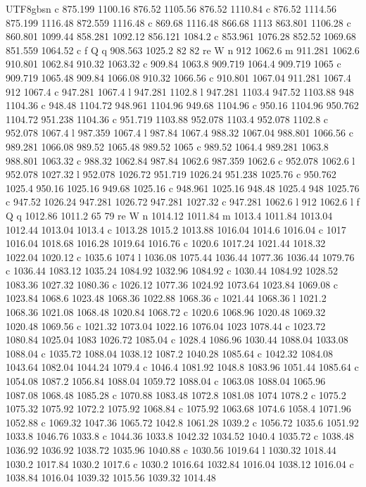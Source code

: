 \documentclass[11pt,a4paper,oneside]{report}
\begin{document}
\begin{CJK*}{UTF8}{gbsn}
{c 875.199 1100.16 876.52 1105.56 876.52 1110.84 c 876.52 1114.56 875.199 1116.48 872.559 1116.48 c 869.68
1116.48 866.68 1113 863.801 1106.28 c 860.801 1099.44 858.281 1092.12 856.121 1084.2 c 853.961 1076.28
852.52 1069.68 851.559 1064.52 c f Q q 908.563 1025.2 82 82 re W n 912 1062.6 m 911.281 1062.6 910.801
1062.84 910.32 1063.32 c 909.84 1063.8 909.719 1064.4 909.719 1065 c 909.719 1065.48 909.84 1066.08
910.32 1066.56 c 910.801 1067.04 911.281 1067.4 912 1067.4 c 947.281 1067.4 l 947.281 1102.8 l 947.281
1103.4 947.52 1103.88 948 1104.36 c 948.48 1104.72 948.961 1104.96 949.68 1104.96 c 950.16 1104.96
950.762 1104.72 951.238 1104.36 c 951.719 1103.88 952.078 1103.4 952.078 1102.8 c 952.078 1067.4 l
987.359 1067.4 l 987.84 1067.4 988.32 1067.04 988.801 1066.56 c 989.281 1066.08 989.52 1065.48 989.52
1065 c 989.52 1064.4 989.281 1063.8 988.801 1063.32 c 988.32 1062.84 987.84 1062.6 987.359 1062.6 c
952.078 1062.6 l 952.078 1027.32 l 952.078 1026.72 951.719 1026.24 951.238 1025.76 c 950.762 1025.4
950.16 1025.16 949.68 1025.16 c 948.961 1025.16 948.48 1025.4 948 1025.76 c 947.52 1026.24 947.281
1026.72 947.281 1027.32 c 947.281 1062.6 l 912 1062.6 l f Q q 1012.86 1011.2 65 79 re W n 1014.12 1011.84
m 1013.4 1011.84 1013.04 1012.44 1013.04 1013.4 c 1013.28 1015.2 1013.88 1016.04 1014.6 1016.04 c 1017
1016.04 1018.68 1016.28 1019.64 1016.76 c 1020.6 1017.24 1021.44 1018.32 1022.04 1020.12 c 1035.6 1074 l
1036.08 1075.44 1036.44 1077.36 1036.44 1079.76 c 1036.44 1083.12 1035.24 1084.92 1032.96 1084.92 c
1030.44 1084.92 1028.52 1083.36 1027.32 1080.36 c 1026.12 1077.36 1024.92 1073.64 1023.84 1069.08 c
1023.84 1068.6 1023.48 1068.36 1022.88 1068.36 c 1021.44 1068.36 l 1021.2 1068.36 1021.08 1068.48 1020.84
1068.72 c 1020.6 1068.96 1020.48 1069.32 1020.48 1069.56 c 1021.32 1073.04 1022.16 1076.04 1023 1078.44 c
1023.72 1080.84 1025.04 1083 1026.72 1085.04 c 1028.4 1086.96 1030.44 1088.04 1033.08 1088.04 c 1035.72
1088.04 1038.12 1087.2 1040.28 1085.64 c 1042.32 1084.08 1043.64 1082.04 1044.24 1079.4 c 1046.4 1081.92
1048.8 1083.96 1051.44 1085.64 c 1054.08 1087.2 1056.84 1088.04 1059.72 1088.04 c 1063.08 1088.04 1065.96
1087.08 1068.48 1085.28 c 1070.88 1083.48 1072.8 1081.08 1074 1078.2 c 1075.2 1075.32 1075.92 1072.2
1075.92 1068.84 c 1075.92 1063.68 1074.6 1058.4 1071.96 1052.88 c 1069.32 1047.36 1065.72 1042.8 1061.28
1039.2 c 1056.72 1035.6 1051.92 1033.8 1046.76 1033.8 c 1044.36 1033.8 1042.32 1034.52 1040.4 1035.72 c
1038.48 1036.92 1036.92 1038.72 1035.96 1040.88 c 1030.56 1019.64 l 1030.32 1018.44 1030.2 1017.84 1030.2
1017.6 c 1030.2 1016.64 1032.84 1016.04 1038.12 1016.04 c 1038.84 1016.04 1039.32 1015.56 1039.32 1014.48
}
\end{CJK*}
\end{document}
